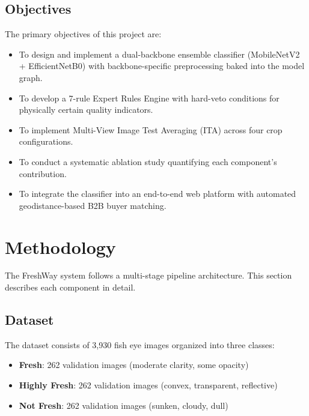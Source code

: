 \documentclass[conference]{IEEEtran}
\begin{document}
\subsection{Objectives}

The primary objectives of this project are:
\begin{itemize}[leftmargin=*]
    \item To design and implement a dual-backbone ensemble classifier (MobileNetV2 + EfficientNetB0) with backbone-specific preprocessing baked into the model graph.
    \item To develop a 7-rule Expert Rules Engine with hard-veto conditions for physically certain quality indicators.
    \item To implement Multi-View Image Test Averaging (ITA) across four crop configurations.
    \item To conduct a systematic ablation study quantifying each component's contribution.
    \item To integrate the classifier into an end-to-end web platform with automated geodistance-based B2B buyer matching.
\end{itemize}

\section{Methodology}

The FreshWay system follows a multi-stage pipeline architecture. This section describes each component in detail.

\subsection{Dataset}

The dataset consists of 3,930 fish eye images organized into three classes:
\begin{itemize}[leftmargin=*]
    \item \textbf{Fresh}: 262 validation images (moderate clarity, some opacity)
    \item \textbf{Highly Fresh}: 262 validation images (convex, transparent, reflective)
    \item \textbf{Not Fresh}: 262 validation images (sunken, cloudy, dull)
\end{itemize}
\end{document}
